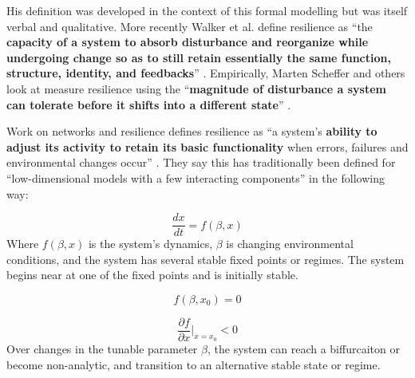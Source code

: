 His definition was developed in the context of this formal modelling but was itself verbal and qualitative. More recently Walker et al. define resilience as %
``the \textbf{capacity of a system to absorb disturbance and reorganize while undergoing change so as to still retain essentially the same function, structure, identity, and feedbacks}'' \cite{walker_resilience_2004}.
Empirically, Marten Scheffer and others look at %
measure resilience using the ``\textbf{magnitude of disturbance a system can tolerate before it shifts into a different state}'' \cite{scheffer_critical_2009}.



Work on networks and resilience defines resilience as ``a system’s \textbf{ability to adjust its activity to retain its basic functionality} when errors, failures and environmental changes occur'' \cite{gao_universal_2016}. %
They say this has traditionally been defined for ``low-dimensional models with a few interacting components'' in the following way:

\begin{equation}
   \frac{dx}{dt} = f(\beta, x)
\end{equation}
Where $f(\beta, x)$ is the system's dynamics, $\beta$ is changing environmental conditions, and the system has several stable fixed points or regimes. The system begins near at one of the fixed points and is initially stable.

\begin{equation}
   f(\beta, x_0) = 0
\end{equation}

\begin{equation}
   \frac{\partial f}{\partial x} \bigg|_{x = x_0} < 0
\end{equation}
Over changes in the tunable parameter $\beta$, the system can reach a biffurcaiton or become non-analytic, and transition to an alternative stable state or regime.

